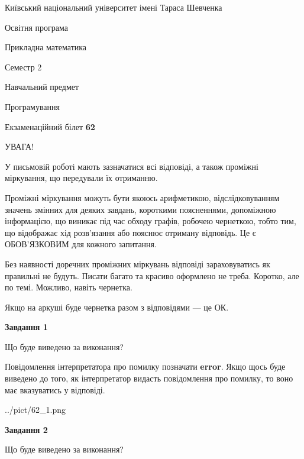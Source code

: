 \documentclass[12pt, ukrainian]{article}
\begin{document}
{{\begin {small}\par
{ \center  Київський національний університет імені Тараса Шевченка \par}
{\parbox {5 cm}{Освітня програма \hfill}{\parbox {7 cm}{Прикладна математика \hfill}}\parbox {6 cm}{\hfill Семестр 2}}\par
{\parbox {5 cm} {Навчальний предмет \hfill}\parbox {7 cm}{Програмування \hfill}\parbox {6cm}{\hfill}\par}\vspace{-7pt} \end{small}}{\center Екзаменаційний білет \No \textbf
{ 62 }\par}}
{
\begin {large}
УВАГА!

У письмовій роботі мають зазначатися всі відповіді, а також проміжні міркування, що передували їх отриманню.

Проміжні міркування можуть бути якоюсь арифметикою, відслідковуванням зна\-чень змінних для деяких завдань,
короткими поясненнями, допоміжною інформацією, що виникає під час обходу графів, робочею чернеткою,
тобто тим, що відображає хід розв’язання або пояснює отриману відповідь.
Це є ОБОВ’ЯЗКОВИМ для кожного запитання.

Без наявності доречних проміжних міркувань відповіді зараховуватись як правиль\-ні не будуть.
Писати багато та красиво оформлено не треба. Коротко, але по темі. Можли\-во, навіть чернетка.

Якщо на аркуші буде чернетка разом з відповідями --- це ОК.

\newpage

{\begin {center}\textbf{Завдання 1}\end {center}}\par
Що буде виведено за виконання?

Повідомлення інтерпретатора про помилку позначати \textbf{error}.
Якщо щось буде виведено до того, як інтерпретатор видасть повідомлення про помилку, 
то воно має вказуватись у відповіді. \par


\begin{center}
	{../pict/62_1.png}
\end{center}
\newpage

{\begin {center}\textbf{Завдання 2}\end {center}}\par
Що буде виведено за виконання?


\end{large}}
\end{document}
